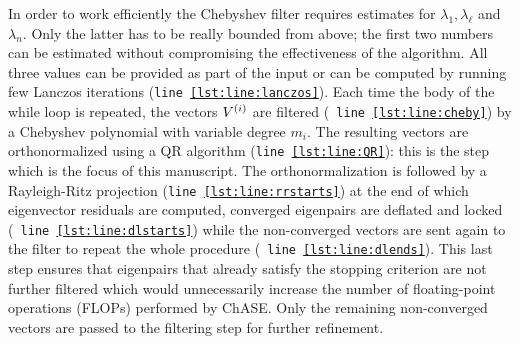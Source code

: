 

In order to work efficiently the
Chebyshev filter requires estimates for $\lambda_1, \lambda_\ell$ and
$\lambda_n$. Only the latter has to be really bounded from above; the
first two numbers can be estimated without compromising the
effectiveness of the algorithm. All three values can be provided as
part of the input or can be computed by running few Lanczos iterations
({\tt line~\ref{lst:line:lanczos}}). Each time the body of the while
loop is repeated, the vectors $V^{(i)}$ are filtered ({\tt
  line~\ref{lst:line:cheby}}) by a Chebyshev polynomial with variable
degree $m_i$. The resulting vectors are orthonormalized using a
QR algorithm ({\tt line~\ref{lst:line:QR}}): this is the step which is the focus of this manuscript.  
The orthonormalization is followed by a
Rayleigh-Ritz projection ({\tt line~\ref{lst:line:rrstarts}}) at the
end of which eigenvector residuals are computed,
converged eigenpairs are deflated and locked ({\tt
  line~\ref{lst:line:dlstarts}}) while the non-converged vectors are
sent again to the filter to repeat the whole procedure ({\tt
  line~\ref{lst:line:dlends}}).
This last step ensures that eigenpairs that already satisfy the stopping criterion
are not further filtered which would unnecessarily increase the 
number of floating-point operations (FLOPs) performed by ChASE. 
Only the remaining non-converged vectors are passed to the filtering step for
further refinement.

